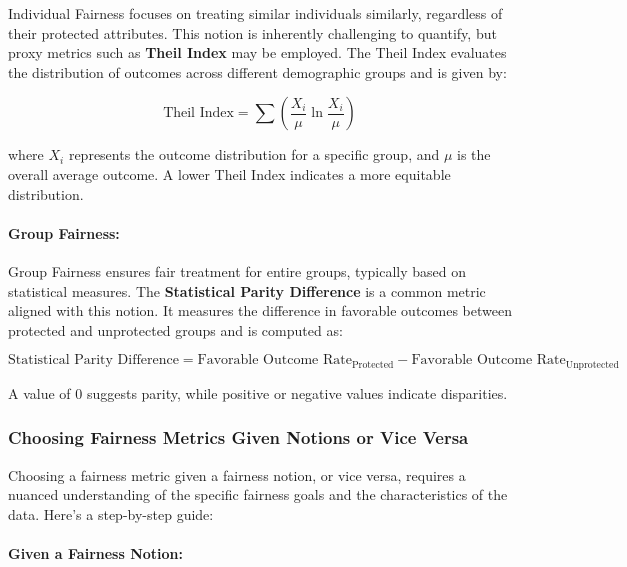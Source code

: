 Individual Fairness focuses on treating similar individuals similarly, regardless of their protected attributes. This notion is inherently challenging to quantify, but proxy metrics such as \textbf{Theil Index} may be employed. The Theil Index evaluates the distribution of outcomes across different demographic groups and is given by:

\[
\text{Theil Index} = \sum \left( \frac{X_{i}}{\mu} \ln \frac{X_{i}}{\mu} \right)
\]

where \(X_{i}\) represents the outcome distribution for a specific group, and \(\mu\) is the overall average outcome. A lower Theil Index indicates a more equitable distribution.

\paragraph{Group Fairness:}

Group Fairness ensures fair treatment for entire groups, typically based on statistical measures. The \textbf{Statistical Parity Difference} is a common metric aligned with this notion. It measures the difference in favorable outcomes between protected and unprotected groups and is computed as:

\[
\text{Statistical Parity Difference} = \text{Favorable Outcome Rate}_{\text{Protected}} - \text{Favorable Outcome Rate}_{\text{Unprotected}}
\]

A value of 0 suggests parity, while positive or negative values indicate disparities.

\subsubsection{Choosing Fairness Metrics Given Notions or Vice Versa}

Choosing a fairness metric given a fairness notion, or vice versa, requires a nuanced understanding of the specific fairness goals and the characteristics of the data. Here's a step-by-step guide:

\paragraph{Given a Fairness Notion:}

